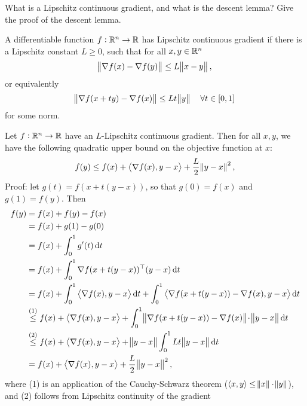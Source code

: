 \documentclass{article}
\begin{document}
\begin{question}
  What is a Lipschitz continuous gradient, and what is the descent lemma?  Give the proof of the
  descent lemma.
\end{question}

A differentiable function \(f: \mathbb{R}^n \to \mathbb{R}\) has Lipschitz continuous gradient if there is
a Lipschitz constant \(L \geq 0\), such that for all \(x, y \in \mathbb{R}^n\)
\begin{equation*}
  \enVert{\nabla f(x) - \nabla f(y)} \leq L \enVert[1]{x - y},
\end{equation*}
or equivalently
\begin{equation*}
  \enVert{\nabla f(x + ty) - \nabla f(x)} \leq Lt \enVert[1]{y} \quad \forall t \in [0, 1]
\end{equation*}
for some norm.

Let \(f: \mathbb{R}^n \to \mathbb{R}\) have an \(L\)-Lipschitz continuous gradient.  Then for all \(x, y\), we
have the following quadratic upper bound on the objective function at \(x\):
\begin{equation*}
  f(y) \leq f(x) + \iprod{\nabla f(x)}{y - x} + \frac{L}{2}\enVert{y - x}^2,
\end{equation*}
Proof: let \(g(t) = f(x + t(y - x))\), so that \(g(0) = f(x)\) and \(g(1) = f(y)\). Then
\begin{align*}
  f(y) &= f(x) + f(y) - f(x) \\
       &= f(x) + g(1) - g(0) \\
       &= f(x) + \int_0^1 g'(t) \dif t \\
       &= f(x) + \int_0^1 \T{\nabla f(x + t(y - x))} (y - x) \dif t \\
       &= f(x) + \int_0^1 \iprod{\nabla f(x)}{y - x} \dif t
         + \int_0^1 \iprod{\nabla f(x + t(y - x)) - \nabla f(x)}{y - x} \dif t \\
       &\overset{(1)}{\leq} f(x) + \iprod{\nabla f(x)}{y - x}
         + \int_0^1 \enVert[1]{\nabla f(x + t(y - x)) - \nabla f(x)}\! \cdot \enVert[1]{y - x} \dif t \\
       &\overset{(2)}{\leq} f(x) + \iprod{\nabla f(x)}{y - x} + \enVert[1]{y - x} \int_0^1 Lt\enVert[1]{y - x} \dif t \\
       &= f(x) + \iprod{\nabla f(x)}{y - x} + \frac{L}{2}\enVert[1]{y - x}^2,
\end{align*}
where (1) is an application of the Cauchy-Schwarz theorem
(\(\langle x, y \rangle \leq \enVert{x} \cdot \enVert{y}\)), and (2) follows from Lipschitz
continuity of the gradient
\end{document}
